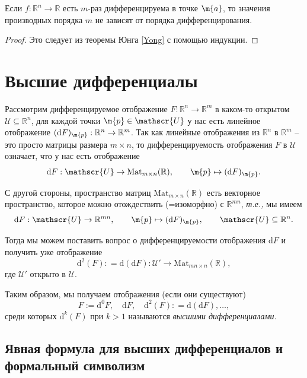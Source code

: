 \begin{corollary}\label{f''xy=f''yx}
    Если $f:\mathbb{R}^n \to \mathbb{R}$ есть $m$-раз дифференцируема в точке $\m{a}$, то значения производных порядка $m$ не зависят от порядка дифференцирования.
\end{corollary}

\begin{proof}
Это следует из теоремы Юнга \ref{Yong} с помощью индукции.


\end{proof}






\section{Высшие дифференциалы}

Рассмотрим дифференцируемое отображение $F: \mathbb{R}^n \to \mathbb{R}^m$ в каком-то открытом $\mathscr{U} \subseteq \mathbb{R}^n$, \ie для каждой точки $\m{p} \in \mathscr{U}$ у нас есть линейное отображение $(\mathrm{d}F)_{\m{p}}: \mathbb{R}^n\to \mathbb{R}^m$. Так как линейные отображения из $\mathbb{R}^n$ в $\mathbb{R}^m$ -- это просто матрицы размера $m\times n$, то дифференцируемость отображения $F$ в $\mathscr{U}$ означает, что у нас есть отображение
\[
 \mathrm{d}F: \mathscr{U} \to \mathrm{Mat}_{m\times n}(\mathbb{R}), \qquad \m{p} \mapsto (\mathrm{d}F)_{\m{p}}.
\]

С другой стороны, пространство матриц $\mathrm{Mat}_{m\times n}(\mathbb{R})$ есть векторное пространство, которое можно отождествить (=изоморфно) с $\mathbb{R}^{mn}$, \textit{т.е.,} мы имеем
\[
 \mathrm{d}F: \mathscr{U} \to \mathbb{R}^{mn}, \qquad \m{p} \mapsto (\mathrm{d}F)_{\m{p}}, \qquad \mathscr{U} \subseteq \mathbb{R}^n.
\]

Тогда мы можем поставить вопрос о дифференцируемости отображения $\mathrm{d}F$ и получить уже отображение
\[
 \mathrm{d}^2(F): = \mathrm{d}(\mathrm{d}F): \mathscr{U}' \to \mathrm{Mat}_{mn
 \times n}(\mathbb{R}),
\]
где $\mathscr{U}'$ открыто в $\mathscr{U}$.

Таким образом, мы получаем отображения (если они существуют)
\[
 F:=\mathrm{d}^0F,\quad  \mathrm{d}F,\quad \mathrm{d}^2(F): = \mathrm{d}(\mathrm{d}F), \ldots, 
\]
среди которых $\mathrm{d}^k(F)$ при $k>1$ называются \textit{высшими дифференциалами.}


\subsection{Явная формула для высших дифференциалов и формальный символизм}

